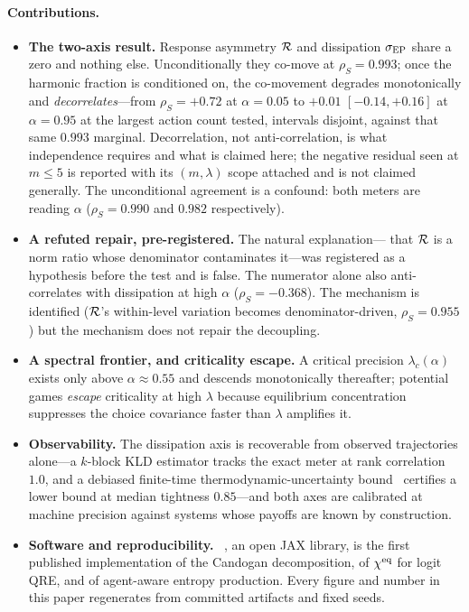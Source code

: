 \paragraph{Contributions.}
\begin{itemize}
\item[\textbf{(C1)}] \textbf{The two-axis result.} Response asymmetry $\mathcal{R}$ and dissipation
$\sigma_{\mathrm{EP}}$ share a zero and nothing else. Unconditionally they co-move at $\rho_S=0.993$; once
the harmonic fraction is conditioned on, the co-movement degrades monotonically and
\emph{decorrelates}---from $\rho_S=+0.72$ at $\alpha=0.05$ to $+0.01$ $[-0.14,+0.16]$ at
$\alpha=0.95$ at the largest action count tested, intervals disjoint, against that same
$0.993$ marginal. Decorrelation, not anti-correlation, is what independence requires and
what is claimed here; the negative residual seen at $m\le5$ is reported with its
$(m,\lambda)$ scope attached and is not claimed generally. The unconditional agreement is a
confound: both meters are reading $\alpha$ ($\rho_S=0.990$ and $0.982$ respectively).
\item[\textbf{(C2)}] \textbf{A refuted repair, pre-registered.} The natural explanation---
that $\mathcal{R}$ is a norm ratio whose denominator contaminates it---was registered as a hypothesis
before the test and is false. The numerator alone also anti-correlates with dissipation at
high $\alpha$ ($\rho_S=-0.368$). The mechanism is identified ($\mathcal{R}$'s within-level variation
becomes denominator-driven, $\rho_S=0.955$) but the mechanism does not repair the
decoupling.
\item[\textbf{(C3)}] \textbf{A spectral frontier, and criticality escape.} A critical
precision $\lambda_c(\alpha)$ exists only above $\alpha\approx0.55$ and descends
monotonically thereafter; potential games \emph{escape} criticality at high $\lambda$
because equilibrium concentration suppresses the choice covariance faster than $\lambda$
amplifies it.
\item[\textbf{(C4)}] \textbf{Observability.} The dissipation axis is recoverable from
observed trajectories alone---a $k$-block KLD estimator tracks the exact meter at rank
correlation $1.0$, and a debiased finite-time thermodynamic-uncertainty
bound~\cite{barato2015} certifies a lower bound at median tightness $0.85$---and both axes
are calibrated at machine precision against systems whose payoffs are known by construction.
\item[\textbf{(C5)}] \textbf{Software and reproducibility.} \strataq~\cite{strataq}, an
open JAX library, is the first published implementation of the Candogan decomposition, of
$\chi^{\mathrm{eq}}$ for logit QRE, and of agent-aware entropy production. Every figure and number in
this paper regenerates from committed artifacts and fixed seeds.
\end{itemize}

